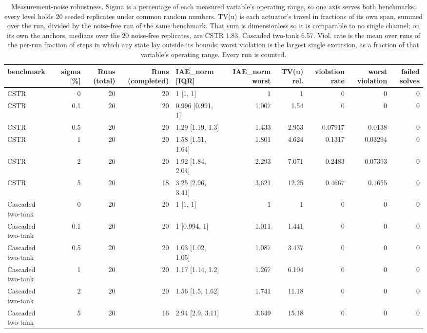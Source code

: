 \begin{table}
\caption{Measurement-noise robustness. Sigma is a percentage of each measured variable's operating range, so one axis serves both benchmarks; every level holds 20 seeded replicates under common random numbers. TV(u) is each actuator's travel in fractions of its own span, summed over the run, divided by the noise-free run of the same benchmark. That sum is dimensionless so it is  comparable to no single channel; on its own the anchors, medians over the 20 noise-free replicates, are CSTR 1.83, Cascaded two-tank 6.57. Viol. rate is the mean over runs of the per-run fraction of steps in which any state lay outside its bounds; worst violation is the largest single excursion, as a fraction of that variable's operating range. Every run is counted.}
\label{tab:T1_measurement_noise}
\begin{tabular}{lrrrlrrrrr}
\toprule
benchmark & sigma [\%] & Runs (total) & Runs (completed) & IAE\_norm [IQR] & IAE\_norm worst & TV(u) rel. & violation rate & worst violation & failed solves \\
\midrule
CSTR & 0 & 20 & 20 & 1 [1, 1] & 1 & 1 & 0 & 0 & 0 \\
CSTR & 0.1 & 20 & 20 & 0.996 [0.991, 1] & 1.007 & 1.54 & 0 & 0 & 0 \\
CSTR & 0.5 & 20 & 20 & 1.29 [1.19, 1.3] & 1.433 & 2.953 & 0.07917 & 0.0138 & 0 \\
CSTR & 1 & 20 & 20 & 1.58 [1.51, 1.64] & 1.801 & 4.624 & 0.1317 & 0.03294 & 0 \\
CSTR & 2 & 20 & 20 & 1.92 [1.84, 2.04] & 2.293 & 7.071 & 0.2483 & 0.07393 & 0 \\
CSTR & 5 & 20 & 18 & 3.25 [2.96, 3.41] & 3.621 & 12.25 & 0.4667 & 0.1655 & 0 \\
Cascaded two-tank & 0 & 20 & 20 & 1 [1, 1] & 1 & 1 & 0 & 0 & 0 \\
Cascaded two-tank & 0.1 & 20 & 20 & 1 [0.994, 1] & 1.011 & 1.441 & 0 & 0 & 0 \\
Cascaded two-tank & 0.5 & 20 & 20 & 1.03 [1.02, 1.05] & 1.087 & 3.437 & 0 & 0 & 0 \\
Cascaded two-tank & 1 & 20 & 20 & 1.17 [1.14, 1.2] & 1.267 & 6.104 & 0 & 0 & 0 \\
Cascaded two-tank & 2 & 20 & 20 & 1.56 [1.5, 1.62] & 1.741 & 11.18 & 0 & 0 & 0 \\
Cascaded two-tank & 5 & 20 & 16 & 2.94 [2.9, 3.11] & 3.649 & 15.18 & 0 & 0 & 0 \\
\bottomrule
\end{tabular}
\end{table}
